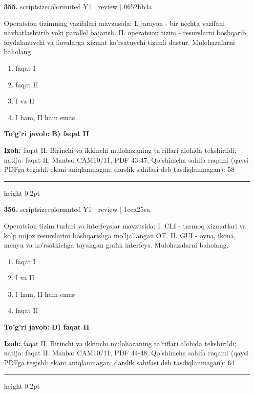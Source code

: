 \documentclass[10pt,a4paper]{article}
\begin{document}
{\bfseries\sffamily\color{ink} 355.} {scriptsizecolor{muted} Y1 | review | 0652bb4a}
\par
Operatsion tizimning vazifalari mavzusida: I. jarayon - bir nechta vazifani navbatlashtirib yoki parallel bajarish. II. operatsion tizim - resurslarni boshqarib, foydalanuvchi va ilovalarga xizmat ko'rsatuvchi tizimli dastur. Mulohazalarni baholang.
\begin{enumerate}[label=\Alph*),leftmargin=9mm]
\item faqat I
\item faqat II
\item I va II
\item I ham, II ham emas
\end{enumerate}
\begin{tcolorbox}[enhanced,breakable,colback=teal!4,colframe=teal!60!black,boxrule=0.45pt,arc=1.2mm,left=2.7mm,right=2.7mm,top=1.8mm,bottom=1.8mm,before skip=2mm,after skip=2mm]
{\bfseries\sffamily\color{teal}To'g'ri javob:} \textbf{B) faqat II}
\par\smallskip
{\bfseries Izoh:} faqat II. Birinchi va ikkinchi mulohazaning ta'riflari alohida tekshirildi; natija: faqat II. Manba: CAM10/11, PDF 43-47; Qo'shimcha sahifa raqami (qaysi PDFga tegishli ekani aniqlanmagan; darslik sahifasi deb tasdiqlanmagan): 58
\end{tcolorbox}
\vspace{2mm}\hrule height 0.2pt\vspace{3mm}

{\bfseries\sffamily\color{ink} 356.} {scriptsizecolor{muted} Y1 | review | 1cea25ea}
\par
Operatsion tizim turlari va interfeyslar mavzusida: I. CLI - tarmoq xizmatlari va ko'p mijoz resurslarini boshqarishga mo'ljallangan OT. II. GUI - oyna, ikona, menyu va ko'rsatkichga tayangan grafik interfeys. Mulohazalarni baholang.
\begin{enumerate}[label=\Alph*),leftmargin=9mm]
\item faqat I
\item I va II
\item I ham, II ham emas
\item faqat II
\end{enumerate}
\begin{tcolorbox}[enhanced,breakable,colback=teal!4,colframe=teal!60!black,boxrule=0.45pt,arc=1.2mm,left=2.7mm,right=2.7mm,top=1.8mm,bottom=1.8mm,before skip=2mm,after skip=2mm]
{\bfseries\sffamily\color{teal}To'g'ri javob:} \textbf{D) faqat II}
\par\smallskip
{\bfseries Izoh:} faqat II. Birinchi va ikkinchi mulohazaning ta'riflari alohida tekshirildi; natija: faqat II. Manba: CAM10/11, PDF 44-48; Qo'shimcha sahifa raqami (qaysi PDFga tegishli ekani aniqlanmagan; darslik sahifasi deb tasdiqlanmagan): 64
\end{tcolorbox}
\vspace{2mm}\hrule height 0.2pt\vspace{3mm}
\end{document}
